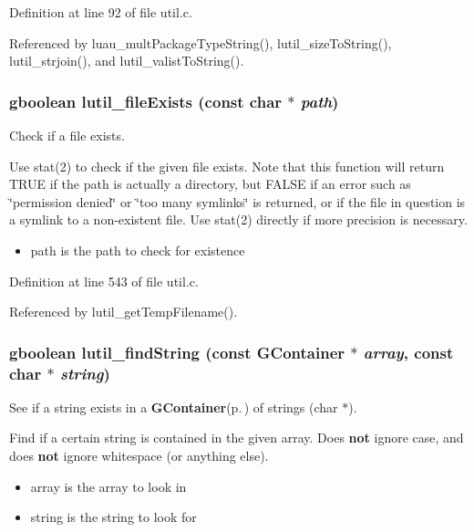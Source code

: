 Definition at line 92 of file util.c.

Referenced by luau\_\-mult\-Package\-Type\-String(), lutil\_\-size\-To\-String(), lutil\_\-strjoin(), and lutil\_\-valist\-To\-String().
\subsubsection{\setlength{\rightskip}{0pt plus 5cm}gboolean lutil\_\-file\-Exists (const char $\ast$ {\em path})}\label{util_8c_a17}


Check if a file exists. 

Use stat(2) to check if the given file exists. Note that this function will return TRUE if the path is actually a directory, but FALSE if an error such as \char`\"{}permission denied\char`\"{} or \char`\"{}too many symlinks\char`\"{} is returned, or if the file in question is a symlink to a non-existent file. Use stat(2) directly if more precision is necessary.

\begin{itemize}
\item path is the path to check for existence 
\end{itemize}


Definition at line 543 of file util.c.

Referenced by lutil\_\-get\-Temp\-Filename().
\subsubsection{\setlength{\rightskip}{0pt plus 5cm}gboolean lutil\_\-find\-String (const {\bf GContainer} $\ast$ {\em array}, const char $\ast$ {\em string})}\label{util_8c_a8}


See if a string exists in a {\bf GContainer}{\rm (p.\,\pageref{structGContainer})} of strings (char $\ast$). 

Find if a certain string is contained in the given array. Does {\bf not} ignore case, and does {\bf not} ignore whitespace (or anything else).

\begin{itemize}
\item array is the array to look in \item string is the string to look for 
\end{itemize}


